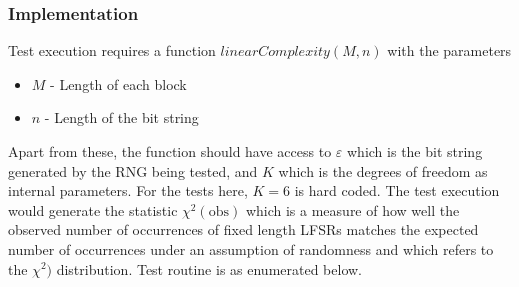  \subsubsection{Implementation}

Test execution requires a function $linearComplexity(M,n)$ with the parameters

\begin{itemize}
    \item $M$ - Length of each block
    \item $n$ - Length of the bit string
\end{itemize}

Apart from these, the function should have access to $\varepsilon$ which is the bit string generated by the RNG being tested, and $K$ which is the degrees of freedom as internal parameters. For the tests here, $K=6$ is hard coded. The test execution would generate the statistic $\chi^2(\text{obs})$ which is a measure of how well the observed number of occurrences of fixed length LFSRs matches the expected number of occurrences under an assumption of randomness and which refers to the $\chi^2)$ distribution. Test routine is as enumerated below.

